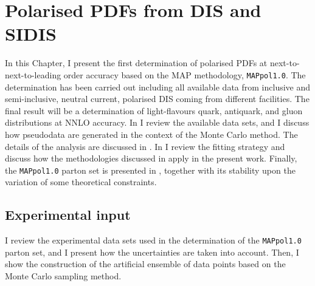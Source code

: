 \chapter{Polarised PDFs from DIS and SIDIS}
\label{ch:4}

In this Chapter, I present the first determination of polarised PDFs at next-to-next-to-leading order accuracy based on the MAP methodology, \texttt{MAPpol1.0}. The determination has been carried out including all available data from inclusive and semi-inclusive, neutral current, polarised DIS coming from different facilities. The final result will be a determination of light-flavours quark, antiquark, and gluon distributions at NNLO accuracy. In  I review the available data sets, and I discuss how pseudodata are generated in the context of the Monte Carlo method. The details of the analysis are discussed in . In  I review the fitting strategy and discuss how the methodologies discussed in  apply in the present work. Finally, the \texttt{MAPpol1.0} parton set is presented in , together with its stability upon the variation of some theoretical constraints.

\section{Experimental input}
\label{sec:4.1}

I review the experimental data sets used in the determination of the \texttt{MAPpol1.0} parton set, and I present how the uncertainties are taken into account. Then, I show the construction of the artificial ensemble of data points based on the Monte Carlo sampling method.

